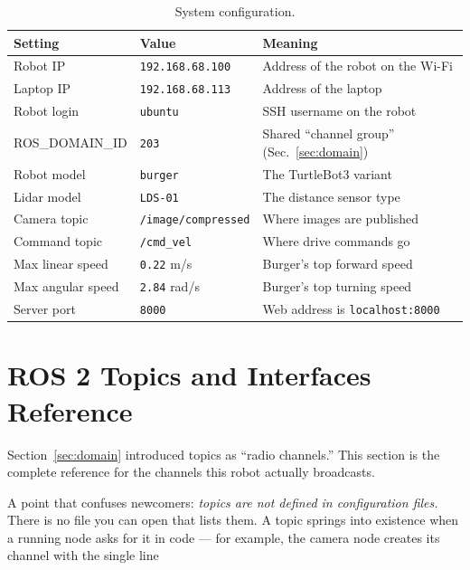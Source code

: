 \documentclass[11pt,a4paper]{article}
\newcommand{\code}[1]{\texttt{#1}}
\begin{document}
\begin{table}[h]
\centering
\begin{tabular}{@{}lll@{}}
\toprule
\textbf{Setting} & \textbf{Value} & \textbf{Meaning} \\
\midrule
Robot IP        & \code{192.168.68.100} & Address of the robot on the Wi-Fi \\
Laptop IP       & \code{192.168.68.113} & Address of the laptop \\
Robot login     & \code{ubuntu}         & SSH username on the robot \\
ROS\_DOMAIN\_ID & \code{203}            & Shared ``channel group'' (Sec.~\ref{sec:domain}) \\
Robot model     & \code{burger}         & The TurtleBot3 variant \\
Lidar model     & \code{LDS-01}         & The distance sensor type \\
Camera topic    & \code{/image/compressed} & Where images are published \\
Command topic   & \code{/cmd\_vel}      & Where drive commands go \\
Max linear speed & \code{0.22} m/s      & Burger's top forward speed \\
Max angular speed & \code{2.84} rad/s   & Burger's top turning speed \\
Server port     & \code{8000}           & Web address is \code{localhost:8000} \\
\bottomrule
\end{tabular}
\caption{System configuration.}
\label{tab:config}
\end{table}

\section{ROS 2 Topics and Interfaces Reference}
\label{sec:topics}
Section~\ref{sec:domain} introduced topics as ``radio channels.'' This section
is the complete reference for the channels this robot actually broadcasts.

A point that confuses newcomers: \emph{topics are not defined in configuration
files.} There is no file you can open that lists them. A topic springs into
existence when a running node asks for it in code --- for example, the camera
node creates its channel with the single line
\end{document}
